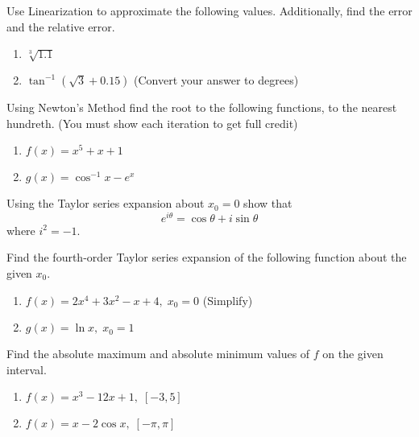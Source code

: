 \documentclass[unboxed]{hwset}
\date{13 April 2011}
\begin{document}
\begin{problem}[1.]
	Use Linearization to approximate the following values. Additionally, find
	the error and the relative error.
	\begin{enumerate}
		\item $\sqrt[3]{1.1}$
		\item $\tan^{-1} (\sqrt{3} + 0.15)$ (Convert your answer to degrees)
	\end{enumerate}
\end{problem}

\begin{problem}[2.]
	Using Newton's Method find the root to the following functions, to the nearest
	hundreth. (You must show each iteration to get full credit)
	\begin{enumerate}
		\item $f(x) = x^5 + x + 1$
		\item $g(x) = \cos^{-1} x - e^x$
	\end{enumerate}
\end{problem}

\begin{problem}[3.]
	Using the Taylor series expansion about $x_0 = 0$ show that 
	\begin{equation*}
		e^{i \theta} = \cos \theta + i \sin \theta
	\end{equation*}
	where $i^2 = -1$. 
\end{problem}

\begin{problem}[4.]
	Find the fourth-order Taylor series expansion of the following function about
	the given $x_0$.
	\begin{enumerate}
		\item $f(x) = 2x^4 + 3x^2 - x + 4,\; x_0 = 0$ (Simplify)
		\item $g(x) = \ln x,\; x_0 = 1$
	\end{enumerate}
\end{problem}

\begin{problem}[5.]
	Find the absolute maximum and absolute minimum values of $f$ on the given
	interval.
	\begin{enumerate}
		\item $f(x) = x^3 - 12x + 1,\; [-3,5]$
		\item $f(x) = x - 2\cos x,\; [-\pi, \pi]$
	\end{enumerate}
\end{problem}
\end{document}

